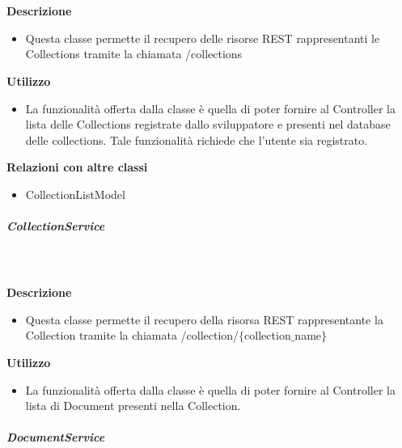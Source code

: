         \textbf{\\ \\ Descrizione} 
          \begin{itemize}
            \item[] Questa classe permette il recupero delle risorse REST rappresentanti le Collections tramite la chiamata /collections
          \end{itemize}      
        \textbf{Utilizzo}  
          \begin{itemize}
            \item[] La funzionalità offerta dalla classe è quella di poter fornire al Controller la lista delle Collections registrate dallo sviluppatore e presenti nel database delle collections.
Tale funzionalità richiede che l'utente sia registrato.
          \end{itemize}
          \textbf{Relazioni con altre classi}
          \begin{itemize}
              \item{CollectionListModel}
          \end{itemize}
      \subparagraph{CollectionService}
        
        \textbf{\\ \\ Descrizione} 
          \begin{itemize}
            \item[] Questa classe permette il recupero della risorsa REST rappresentante la Collection tramite la chiamata  /collection/$\{$collection$\_$name$\}$
          \end{itemize}      
        \textbf{Utilizzo}  
          \begin{itemize}
            \item[] La  funzionalità offerta dalla classe è quella di poter fornire al Controller la lista di Document presenti nella Collection.
          \end{itemize}
      \subparagraph{DocumentService}
        
